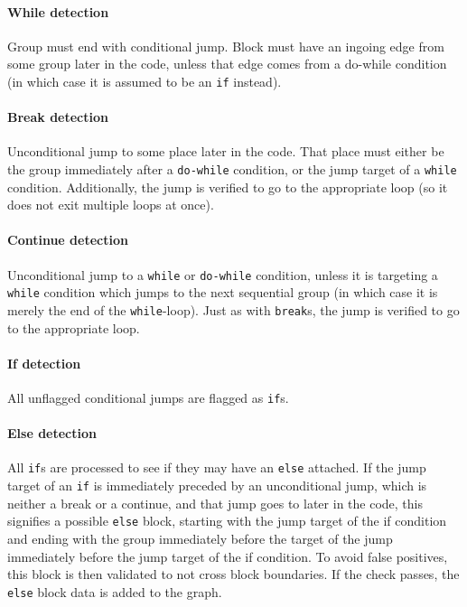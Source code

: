 \paragraph{While detection}
Group must end with conditional jump. Block must have an ingoing edge from some group later in the code, unless that edge comes from a do-while condition (in which case it is assumed to be an \verb+if+ instead).

\paragraph{Break detection}
Unconditional jump to some place later in the code. That place must either be the group immediately after a \verb+do-while+ condition, or the jump target of a \verb+while+ condition. Additionally, the jump is verified to go to the appropriate loop (so it does not exit multiple loops at once).

\paragraph{Continue detection}
Unconditional jump to a \verb+while+ or \verb+do-while+ condition, unless it is targeting a \verb+while+ condition which jumps to the next sequential group (in which case it is merely the end of the \verb+while+-loop). Just as with \verb+break+s, the jump is verified to go to the appropriate loop.

\paragraph{If detection}
All unflagged conditional jumps are flagged as \verb+if+s.

\paragraph{Else detection}
All \verb+if+s are processed to see if they may have an \verb+else+ attached. If the jump target of an \verb+if+ is immediately preceded by an unconditional jump, which is neither a break or a continue, and that jump goes to later in the code, this signifies a possible \verb+else+ block, starting with the jump target of the if condition and ending with the group immediately before the target of the jump immediately before the jump target of the if condition. To avoid false positives, this block is then validated to not cross block boundaries. If the check passes, the \verb+else+ block data is added to the graph.

